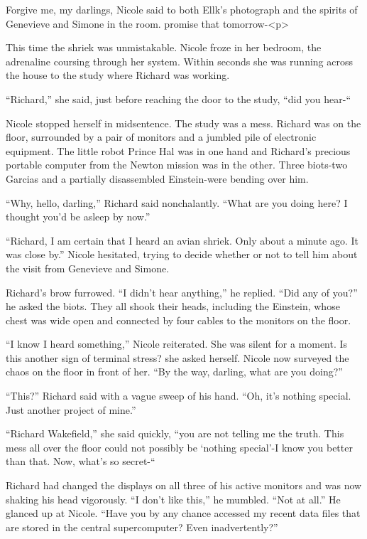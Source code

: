 \documentclass[]{article}
\begin{document}
{Forgive me, my darlings, Nicole said to both Ellk’s photograph and the spirits of Genevieve and Simone in the room. promise that tomorrow-<p>

This time the shriek was unmistakable. Nicole froze in her bedroom, the adrenaline coursing through her system. Within seconds she was running across the house to the study where Richard was working.

“Richard,” she said, just before reaching the door to the study, “did you hear-“

Nicole stopped herself in midsentence. The study was a mess. Richard was on the floor, surrounded by a pair of monitors and a jumbled pile of electronic equipment. The little robot Prince Hal was in one hand and Richard’s precious portable computer from the Newton mission was in the other. Three biots-two Garcias and a partially disassembled Einstein-were bending over him.

“Why, hello, darling,” Richard said nonchalantly. “What are you doing here? I thought you’d be asleep by now.”

“Richard, I am certain that I heard an avian shriek. Only about a minute ago. It was close by.” Nicole hesitated, trying to decide whether or not to tell him about the visit from Genevieve and Simone.

Richard’s brow furrowed. “I didn’t hear anything,” he replied. “Did any of you?” he asked the biots. They all shook their heads, including the Einstein, whose chest was wide open and connected by four cables to the monitors on the floor.

“I know I heard something,” Nicole reiterated. She was silent for a moment. Is this another sign of terminal stress? she asked herself. Nicole now surveyed the chaos on the floor in front of her. “By the way, darling, what are you doing?”

“This?” Richard said with a vague sweep of his hand. “Oh, it’s nothing special. Just another project of mine.”

“Richard Wakefield,” she said quickly, “you are not telling me the truth. This mess all over the floor could not possibly be ‘nothing special’-I know you better than that. Now, what’s so secret-“

Richard had changed the displays on all three of his active monitors and was now shaking his head vigorously. “I don’t like this,” he mumbled. “Not at all.” He glanced up at Nicole. “Have you by any chance accessed my recent data files that are stored in the central supercomputer? Even inadvertently?”

}
\end{document}
